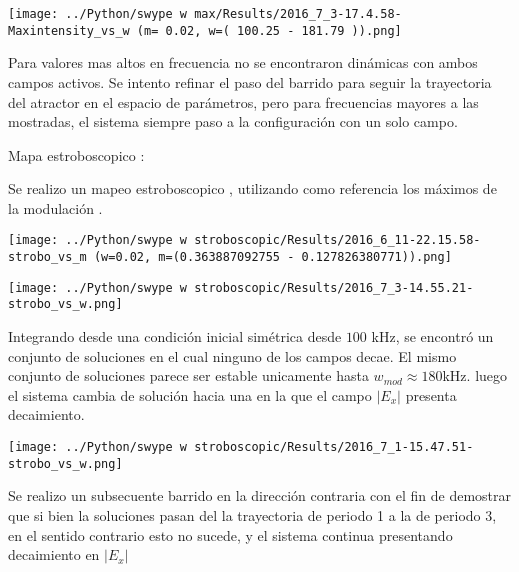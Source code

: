 		\begin{center}
			\texttt{[image: ../Python/swype w max/Results/2016\_7\_3-17.4.58-Maxintensity\_vs\_w (m= 0.02, w=( 100.25 - 181.79 )).png]}
			\label{mapa w 02 ambos campos}
		\end{center}
		
		Para valores mas altos en frecuencia no se encontraron dinámicas con ambos campos activos. Se intento refinar el paso del barrido para seguir la trayectoria del atractor en el espacio de parámetros, pero para frecuencias mayores a las mostradas, el sistema siempre paso a la configuración con un solo campo.
		
		
		Mapa estroboscopico :
		
		Se realizo un mapeo estroboscopico , utilizando como referencia los máximos de la modulación .
				
		\begin{center}
			\texttt{[image: ../Python/swype w stroboscopic/Results/2016\_6\_11-22.15.58-strobo\_vs\_m (w=0.02, m=(0.363887092755 - 0.127826380771)).png]}
		\end{center}
	
		
		\begin{center}
			\texttt{[image: ../Python/swype w stroboscopic/Results/2016\_7\_3-14.55.21-strobo\_vs\_w.png]}
		\end{center}
		
	
		Integrando desde una condición inicial simétrica desde $100$ kHz, se encontró un conjunto de soluciones en el cual ninguno de los campos decae. El mismo conjunto de soluciones parece ser estable unicamente hasta $w_{mod} \approx 180 $kHz. luego el sistema cambia de solución hacia una en la que el campo $|E_x|$ presenta decaimiento.
		
		\begin{center}
			\texttt{[image: ../Python/swype w stroboscopic/Results/2016\_7\_1-15.47.51-strobo\_vs\_w.png]}
		\end{center}
	
		Se realizo un subsecuente barrido en la dirección contraria con el fin de demostrar que si bien la soluciones pasan del la trayectoria de periodo 1 a la de periodo 3, en el sentido contrario esto no sucede, y el sistema continua presentando decaimiento en $|E_x|$
		
